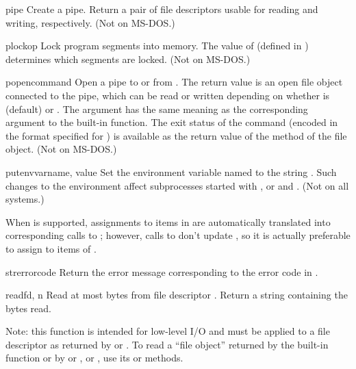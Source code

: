 \begin{funcdesc}{pipe}{}
Create a pipe.  Return a pair of file descriptors  usable for reading and writing, respectively.
(Not on MS-DOS.)
\end{funcdesc}

\begin{funcdesc}{plock}{op}
Lock program segments into memory.  The value of 
(defined in ) determines which segments are locked.
(Not on MS-DOS.)
\end{funcdesc}

\begin{funcdesc}{popen}{command}
Open a pipe to or from .  The return value is an open
file object connected to the pipe, which can be read or written
depending on whether  is  (default) or .
The  argument has the same meaning as the corresponding
argument to the built-in  function.  The exit status of
the command (encoded in the format specified for ) is
available as the return value of the  method of the file
object.
(Not on MS-DOS.)
\end{funcdesc}

\begin{funcdesc}{putenv}{varname, value}
Set the environment variable named  to the string
.  Such changes to the environment affect subprocesses
started with ,  or
 and .  (Not on all systems.)

When  is
supported, assignments to items in  are automatically
translated into corresponding calls to ; however,
calls to  don't update , so it is
actually preferable to assign to items of .  
\end{funcdesc}

\begin{funcdesc}{strerror}{code}
Return the error message corresponding to the error code in .
\end{funcdesc}

\begin{funcdesc}{read}{fd, n}
Read at most  bytes from file descriptor .
Return a string containing the bytes read.

Note: this function is intended for low-level I/O and must be applied
to a file descriptor as returned by  or
.  To read a ``file object'' returned by the
built-in function  or by  or
, or , use its
 or  methods.
\end{funcdesc}

